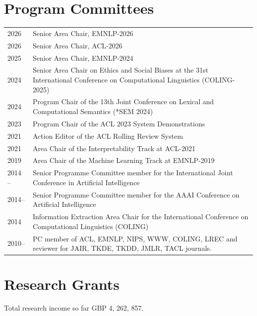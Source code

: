 \documentclass[a4paper,11pt]{article}
\begin{document}
\section{Program Committees}
\begin{tabular}{l p{13cm}}
2026 & Senior Area Chair, EMNLP-2026\\
2026 & Senior Area Chair, ACL-2026\\
2025 & Senior Area Chair, EMNLP-2024\\
2024 & Senior Area Chair on Ethics and Social Biases at the 31st International Conference on Computational Linguistics (COLING-2025)\\
2024 & Program Chair of the 13th Joint Conference on Lexical and Computational Semantics (*SEM 2024)\\
2023 & Program Chair of the ACL 2023 System Demonstrations \\
2021 & Action Editor of the ACL Rolling Review System \\
2021 & Area Chair of the Interpretability Track at ACL-2021\\
2019 & Area Chair of the Machine Learning Track at EMNLP-2019\\
2014 -- & Senior Programme Committee member for the International Joint Conference in Artificial Intelligence\\
2014-- & Senior Programme Committee member for the AAAI Conference on Artificial Intelligence\\
2014 & Information Extraction Area Chair for the International Conference on Computational Linguistics (COLING)\\
2010-- & PC member of ACL, EMNLP, NIPS, WWW, COLING, LREC and reviewer for JAIR, TKDE, TKDD, JMLR, TACL journals.
\end{tabular}



\section{Research Grants}

Total research income so far GBP 4, 262, 857.
\end{document}
